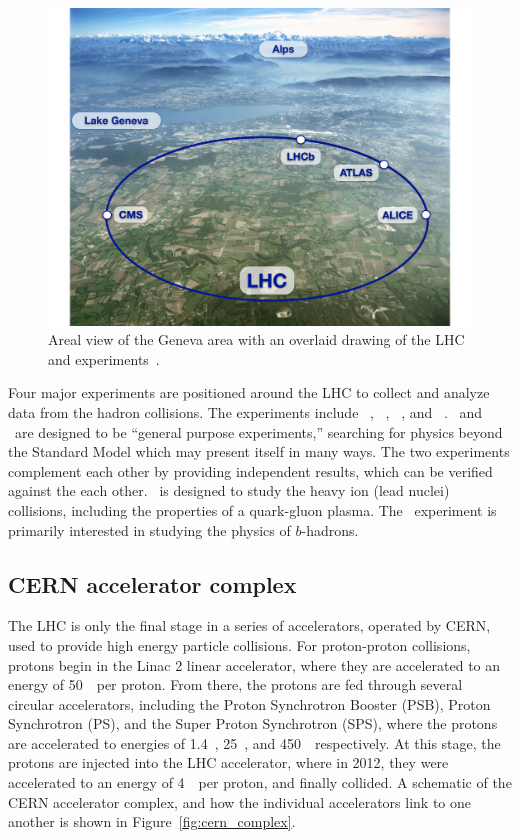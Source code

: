 \begin{figure}[ht]
  \centering
  \includegraphics[width=\textwidth, clip=true, trim=0 0 1cm 0]
    {figs/lhc/lhc_aerial.pdf}
  \caption{
    Areal view of the Geneva area with an overlaid drawing of the LHC
    and experiments~\cite{lhc_aerial}.
  }
  \label{fig:lhc_aerial}
\end{figure}

Four major experiments are positioned around the LHC to collect and analyze
data from the hadron collisions.
The experiments include \atlas~\cite{cern-jinst-atlas},
\cms~\cite{cern-jinst-cms}, \alice~\cite{cern-jinst-alice}, and
\lhcb~\cite{cern-jinst-lhcb}.
\atlas\ and \cms\ are designed to be ``general purpose experiments,'' searching
for physics beyond the Standard Model which may present itself in many ways.
The two experiments complement each other by providing independent results,
which can be verified against the each other.
\alice\ is designed to study the heavy ion (lead nuclei) collisions, 
including the properties of a quark-gluon plasma.
The \lhcb\ experiment is primarily interested in studying the physics of
$b$-hadrons.

\FloatBarrier
\subsection{CERN accelerator complex}
\label{sec:accelerator_complex}

The LHC is only the final stage in a series of accelerators, operated by CERN,
used to provide high energy particle collisions.
For proton-proton collisions, protons begin in the Linac 2 linear
accelerator, where they are accelerated to an energy of 50~\MeV\ per proton.
From there, the protons are fed through several circular accelerators, including
the Proton Synchrotron Booster (PSB), Proton Synchrotron (PS), and the Super
Proton Synchrotron (SPS), where the protons are accelerated to energies of
1.4~\GeV, 25~\GeV, and 450~\GeV\ respectively.
At this stage, the protons are injected into the LHC accelerator, where 
in 2012, they were accelerated to an energy of 4~\TeV\ per proton, and finally
collided.
A schematic of the CERN accelerator complex, and how the individual
accelerators link to one another is shown in Figure~\ref{fig:cern_complex}.

